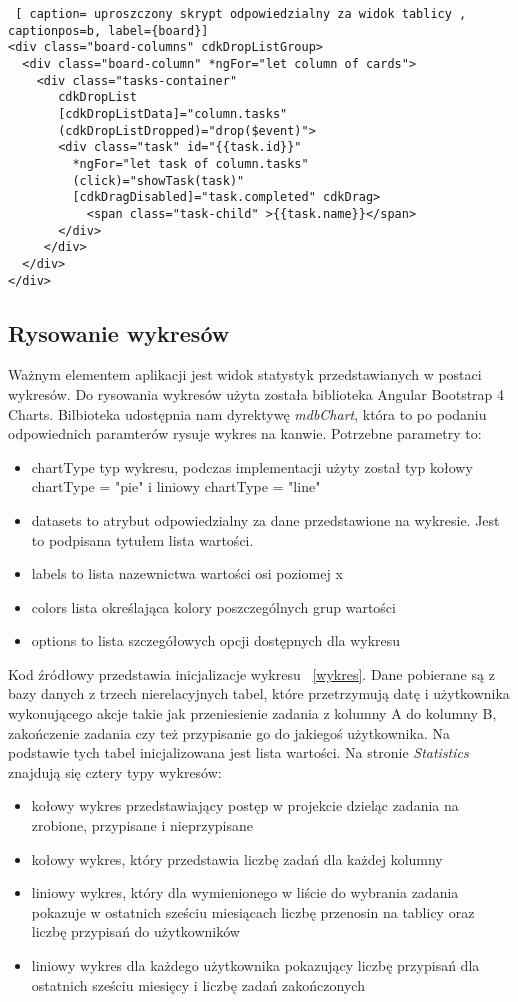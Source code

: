 \begin{lstlisting} [ caption= uproszczony skrypt odpowiedzialny za widok tablicy , captionpos=b, label={board}]
<div class="board-columns" cdkDropListGroup>
  <div class="board-column" *ngFor="let column of cards">
    <div class="tasks-container"
       cdkDropList
       [cdkDropListData]="column.tasks"
       (cdkDropListDropped)="drop($event)">	
       <div class="task" id="{{task.id}}" 
         *ngFor="let task of column.tasks" 
         (click)="showTask(task)" 
         [cdkDragDisabled]="task.completed" cdkDrag>
           <span class="task-child" >{{task.name}}</span>
       </div>
     </div>
  </div>
</div>
\end{lstlisting}
\clearpage
\subsection{Rysowanie wykresów}
Ważnym elementem aplikacji jest widok statystyk przedstawianych w postaci wykresów. Do rysowania wykresów użyta została biblioteka Angular Bootstrap 4 Charts. Bilbioteka udostępnia nam dyrektywę \textit{mdbChart},
która to po podaniu odpowiednich paramterów rysuje wykres na kanwie. \cite{MdbAngularBootstrap} Potrzebne parametry to:
\begin{itemize}
	\item chartType typ wykresu, podczas implementacji użyty został typ kołowy chartType = "pie" i liniowy chartType = "line"
	\item datasets to atrybut odpowiedzialny za dane przedstawione na wykresie. Jest to podpisana tytułem lista wartości.
	\item labels to lista nazewnictwa wartości osi poziomej x
	\item colors lista określająca kolory poszczególnych grup wartości
		\item options to lista szczegółowych opcji dostępnych dla wykresu
\end{itemize}
Kod źródłowy przedstawia inicjalizacje wykresu ~\ref{wykres}. Dane pobierane są z bazy danych z trzech nierelacyjnych tabel, które przetrzymują datę i użytkownika wykonującego akcje takie jak przeniesienie zadania z kolumny A do kolumny B, zakończenie zadania czy też przypisanie go do jakiegoś użytkownika. Na podstawie tych tabel inicjalizowana jest lista wartości. Na stronie \textit{Statistics} znajdują się cztery typy wykresów:
\begin{itemize}
	\item kołowy wykres przedstawiający postęp w projekcie dzieląc zadania na zrobione, przypisane i nieprzypisane
	\item kołowy wykres, który przedstawia liczbę zadań dla każdej kolumny
	\item liniowy wykres, który dla wymienionego w liście do wybrania zadania pokazuje w ostatnich sześciu miesiącach liczbę przenosin na tablicy oraz liczbę przypisań do użytkowników
	\item liniowy wykres dla każdego użytkownika pokazujący liczbę przypisań dla ostatnich sześciu miesięcy i liczbę zadań zakończonych
\end{itemize}


